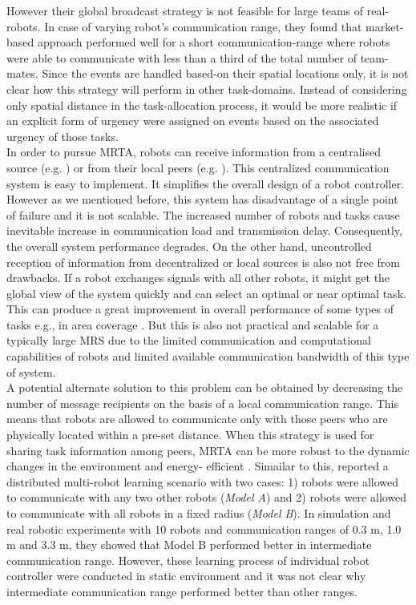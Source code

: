 However their global broadcast strategy is not feasible for large teams of real-robots. In case of varying robot's communication range,  they found that market-based approach performed well for a short communication-range where robots were able to communicate with less than a third of the total number of team-mates. Since the events are handled based-on their spatial locations only, it is not clear how this strategy  will perform in other task-domains. Instead of considering only spatial distance in the task-allocation process, it would be more realistic if an explicit form of urgency were assigned on events  based on the associated urgency of those tasks.\\
In order to pursue MRTA, robots can receive information from a centralised source (e.g. ) or from their local peers (e.g. ). This centralized communication system is easy to implement. It simplifies the overall design of a robot controller. However as we mentioned before, this system has disadvantage of a single point of failure and it is not scalable. The increased number of robots and tasks cause inevitable increase in communication load and transmission delay. Consequently, the overall system performance degrades. On the other hand, uncontrolled reception of information from decentralized or local sources is also not free from drawbacks. If a robot exchanges signals with all other robots, it might get the global view of the system quickly and can select an optimal or near optimal task. This can produce a great improvement in overall performance of some types of tasks e.g., in area coverage \cite{Rutishauser}. But this is also not practical and scalable for a typically large MRS due to the limited communication and computational capabilities of robots and limited available communication bandwidth of this type of system.\\
A potential alternate solution to this problem can be obtained by decreasing the number of message recipients on the basis of a local communication range. This means that robots are allowed to communicate only with those peers who are physically located within a pre-set distance. When this strategy is used for sharing task information among peers, MRTA can be more robust to the dynamic changes in the environment and energy- efficient \cite{Agassounon}. Simailar to this,  reported a distributed multi-robot learning scenario with two cases: 1) robots were allowed to communicate with any two other robots ({\em Model A}) and 2)  robots were allowed to communicate with all robots in a fixed radius ({\em Model B}). In simulation and real robotic experiments with 10 robots and communication ranges of 0.3 m, 1.0 m and 3.3 m, they showed that Model B performed better in intermediate communication range. However, these learning process of individual robot controller were  conducted  in static environment and it was not clear why intermediate communication range performed better than other ranges. \\
